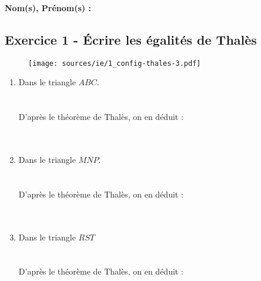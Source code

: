 \documentclass[12pt]{article}
\begin{document}

\setlength{\columnseprule}{1pt}

\textbf{Nom(s), Prénom(s) :}

\subsection*{Exercice 1 - Écrire les égalités de Thalès}

\begin{figure}[H]
  \centering
  \texttt{[image: sources/ie/1\_config-thales-3.pdf]}
\end{figure}

\begin{multicols}{3}
  \begin{enumerate}
  \item Dans le triangle $ABC$.\\ 
  \phantom{abc}\\
  \phantom{abc}\\
  D'après le théorème de Thalès, on en déduit :\\
   \phantom{abc}\\
  \phantom{abc}\\
  \item Dans le triangle $MNP$.\\ 
  \phantom{abc}\\
  \phantom{abc}\\
  D'après le théorème de Thalès, on en déduit :\\
  \phantom{abc}\\
  \phantom{abc}\\
  \item Dans le triangle $RST$\\
  \phantom{abc}\\
  \phantom{abc}\\
  D'après le théorème de Thalès, on en déduit :\\
  \phantom{abc}\\
  \phantom{abc}\\
  \end{enumerate}
\end{multicols}

\vspace{0.3cm}
\noindent\hrulefill
\vspace{0.3cm}
\end{document}
